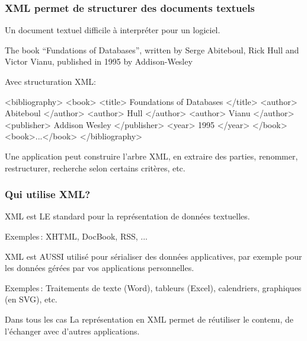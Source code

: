 \begin{frame}[fragile]
\frametitle{XML permet de structurer des documents textuels}

Un document textuel difficile à interpréter pour un logiciel.
\begin{tinyverbatim}
The book ``Fundations of Databases'', written by Serge Abiteboul,
Rick Hull and Victor Vianu, published in 1995 by Addison-Wesley
\end{tinyverbatim}
Avec structuration XML\;:
\begin{tinyverbatim}
<bibliography>
  <book>    
    <title> Foundations of Databases </title>
    <author> Abiteboul </author> 
    <author> Hull </author> 
    <author> Vianu </author>
    <publisher> Addison Wesley </publisher> 
    <year> 1995 </year> </book>
  <book>...</book>
</bibliography>
\end{tinyverbatim}

Une  application peut construire l'arbre XML, en extraire des parties, 
renommer, restructurer, recherche selon certains critères, etc. 
\end{frame}

\begin{frame}[fragile]
\frametitle{Qui utilise XML?}

XML est LE standard pour la représentation  de données textuelles.

\vfill
\alert{Exemples}\,: XHTML, DocBook, RSS, ...

\vfill

XML est AUSSI utilisé pour sérialiser des données applicatives, par exemple pour les données
gérées par vos applications personnelles.


\vfill

\alert{Exemples}\,: Traitements de texte (Word), tableurs (Excel), calendriers, graphiques (en SVG), etc.

\vfill

\begin{beamerboxesrounded}{Dans tous les cas}
La représentation en XML permet de \alert{réutiliser} le contenu, de l'échanger avec d'autres applications.
\end{beamerboxesrounded}
\end{frame}

